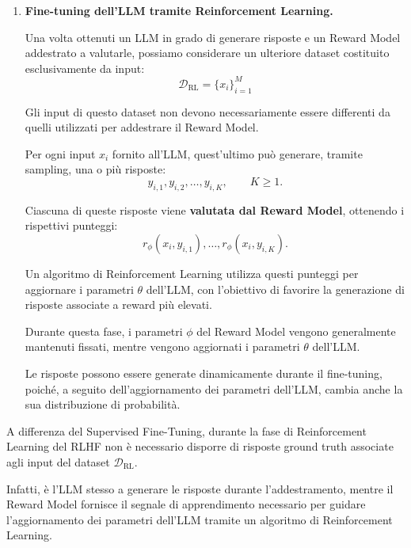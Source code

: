 \begin{enumerate}
    Questo è molto utile perché permette di assegnare
    punteggi anche a nuove risposte, senza richiedere
    ogni volta l'intervento di un valutatore umano.

    \item \textbf{Fine-tuning dell'LLM tramite
    Reinforcement Learning.}

    Una volta ottenuti un LLM in grado di generare risposte
    e un Reward Model addestrato a valutarle, possiamo
    considerare un ulteriore dataset costituito
    esclusivamente da input:
    \[
        \mathcal D_{\mathrm{RL}}
        =
        \{x_i\}_{i=1}^{M}
    \]

    Gli input di questo dataset non devono necessariamente
    essere differenti da quelli utilizzati per addestrare
    il Reward Model.

    Per ogni input $x_i$ fornito all'LLM, quest'ultimo
    può generare, tramite sampling, una o più risposte:
    \[
        y_{i,1},y_{i,2},\ldots,y_{i,K},
        \qquad K \geq 1.
    \]

    Ciascuna di queste risposte viene
    \textbf{valutata dal Reward Model}, ottenendo
    i rispettivi punteggi:
    \[
        r_\phi(x_i,y_{i,1}),
        \ldots,
        r_\phi(x_i,y_{i,K}).
    \]

    Un algoritmo di Reinforcement Learning utilizza
    questi punteggi per aggiornare i parametri $\theta$
    dell'LLM, con l'obiettivo di favorire la generazione
    di risposte associate a reward più elevati.

    Durante questa fase, i parametri $\phi$ del Reward
    Model vengono generalmente mantenuti fissati,
    mentre vengono aggiornati i parametri $\theta$
    dell'LLM.

    Le risposte possono essere generate dinamicamente
    durante il fine-tuning, poiché, a seguito
    dell'aggiornamento dei parametri dell'LLM, cambia
    anche la sua distribuzione di probabilità.
\end{enumerate}

\begin{observation}
    A differenza del Supervised Fine-Tuning, durante
    la fase di Reinforcement Learning del RLHF non
    è necessario disporre di risposte ground truth
    associate agli input del dataset
    $\mathcal D_{\mathrm{RL}}$.

    Infatti, è l'LLM stesso a generare le risposte
    durante l'addestramento, mentre il Reward Model
    fornisce il segnale di apprendimento necessario
    per guidare l'aggiornamento dei parametri
    dell'LLM tramite un algoritmo di Reinforcement
    Learning.
\end{observation}


